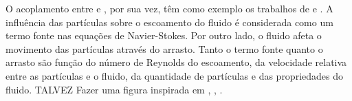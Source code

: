 O acoplamento entre \DEM{} e \CFD{}, por sua vez, têm como exemplo os trabalhos de  e . A influência das partículas sobre o escoamento do fluido é considerada como um termo fonte nas equações de Navier-Stokes. Por outro lado, o fluido afeta o movimento das partículas através do arrasto. Tanto o termo fonte quanto o arrasto são função do número de Reynolds do escoamento, da velocidade relativa entre as partículas e o fluido, da quantidade de partículas e das propriedades do fluido. \alert{TALVEZ Fazer uma figura inspirada em , , }.